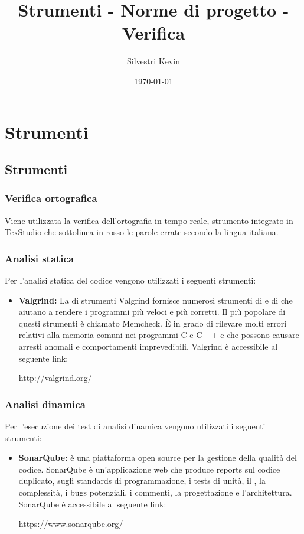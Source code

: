 \documentclass[openany,12pt,a4paper]{report}
\title{Strumenti - Norme di progetto - Verifica}
\author{Silvestri Kevin}
\date{\today}
\begin{document}
\chapter{Strumenti}

\section{Strumenti}
\subsection{Verifica ortografica}
Viene utilizzata la verifica dell’ortografia in tempo reale, strumento integrato in TexStudio
che sottolinea in rosso le parole errate secondo la lingua italiana.
\subsection{Analisi statica}
Per l’analisi statica del codice vengono utilizzati i seguenti strumenti:
\begin{itemize}
\item \textbf{Valgrind:} La  di strumenti Valgrind fornisce numerosi strumenti di  e di  che aiutano a rendere i programmi più veloci e più corretti. Il più popolare di questi strumenti è chiamato Memcheck. È in grado di rilevare molti errori relativi alla memoria comuni nei programmi C e C ++ e che possono causare arresti anomali e comportamenti imprevedibili. Valgrind è accessibile al seguente link: \\ \centerline{\url{http://valgrind.org/}}
\end{itemize}
\subsection{Analisi dinamica}
Per l’esecuzione dei test di analisi dinamica vengono utilizzati i seguenti strumenti:
\begin{itemize}
\item \textbf{SonarQube:} è una piattaforma open source per la gestione della qualità del codice. SonarQube è un’applicazione web che produce reports sul codice duplicato, sugli standards di programmazione, i tests di unità, il , la complessità, i bugs potenziali, i commenti, la progettazione e l’architettura. SonarQube è accessibile al seguente link: \\ \centerline{\url{https://www.sonarqube.org/}}
\end{itemize}
\end{document}

